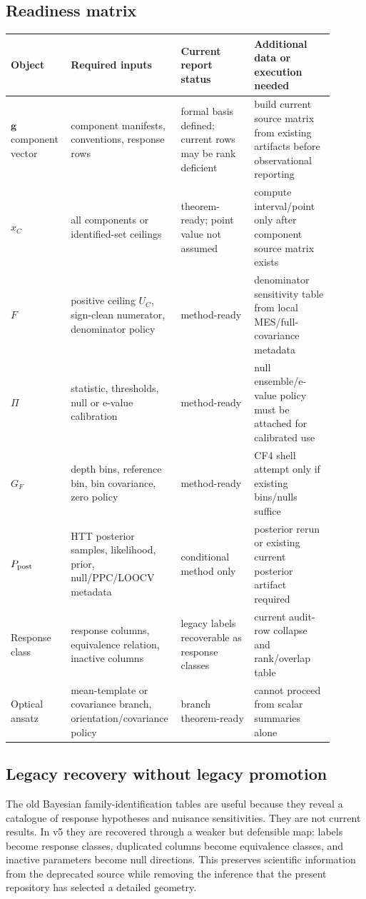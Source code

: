 \documentclass[11pt]{article}
\newcommand{\Ppost}{P_{\rm post}}
\begin{document}
\subsection{Readiness matrix}
{\footnotesize
\begin{longtable}{>{\raggedright\arraybackslash}p{0.18\linewidth} >{\raggedright\arraybackslash}p{0.26\linewidth} >{\raggedright\arraybackslash}p{0.22\linewidth} >{\raggedright\arraybackslash}p{0.24\linewidth}}
\toprule
Object & Required inputs & Current report status & Additional data or execution needed\\
\midrule
\(\bm g\) component vector & component manifests, conventions, response rows & formal basis defined; current rows may be rank deficient & build current source matrix from existing artifacts before observational reporting\\
\(x_C\) & all components or identified-set ceilings & theorem-ready; point value not assumed & compute interval/point only after component source matrix exists\\
\(F\) & positive ceiling \(U_C\), sign-clean numerator, denominator policy & method-ready & denominator sensitivity table from local MES/full-covariance metadata\\
\(\Pi\) & statistic, thresholds, null or e-value calibration & method-ready & null ensemble/e-value policy must be attached for calibrated use\\
\(G_F\) & depth bins, reference bin, bin covariance, zero policy & method-ready & CF4 shell attempt only if existing bins/nulls suffice\\
\(\Ppost\) & HTT posterior samples, likelihood, prior, null/PPC/LOOCV metadata & conditional method only & posterior rerun or existing current posterior artifact required\\
Response class & response columns, equivalence relation, inactive columns & legacy labels recoverable as response classes & current audit-row collapse and rank/overlap table\\
Optical ansatz & mean-template or covariance branch, orientation/covariance policy & branch theorem-ready & cannot proceed from scalar summaries alone\\
\bottomrule
\end{longtable}
}

\subsection{Legacy recovery without legacy promotion}
The old Bayesian family-identification tables are useful because they reveal a catalogue of response hypotheses and nuisance sensitivities.  They are not current results.  In v5 they are recovered through a weaker but defensible map: labels become response classes, duplicated columns become equivalence classes, and inactive parameters become null directions.  This preserves scientific information from the deprecated source while removing the inference that the present repository has selected a detailed geometry.
\end{document}
